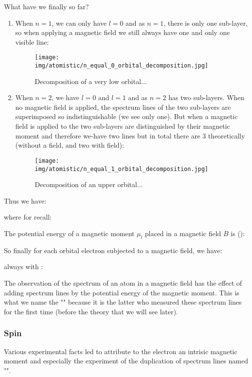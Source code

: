      What have we finally so far?
     \begin{enumerate}
         \item When $n=1$, we can only have $l=0$ and as $n=1$, there is only one sub-layer, so when applying a magnetic field we still always have one and only one visible line:
         \begin{figure}[H]
			\centering
			\texttt{[image: img/atomistic/n\_equal\_0\_orbital\_decomposition.jpg]}
			\caption{Decomposition of a very low orbital...}
		\end{figure}
			
		\item When $n=2$, we have $l=0$ and $l=1$ and as $n=2$ has two sub-layers. When no magnetic field is applied, the spectrum lines of the two sub-layers are superimposed so indistinguishable (we see only one). But when a magnetic field is applied to the two sub-layers are distinguished by their magnetic moment and therefore we-have two lines but in total there are 3 theoretically (without a field, and two with field):
		\begin{figure}[H]
			\centering
			\texttt{[image: img/atomistic/n\_equal\_1\_orbital\_decomposition.jpg]}
			\caption{Decomposition of an upper orbital...}
		\end{figure}
     \end{enumerate}
	Thus we have:
    
    where for recall:
     
    The potential energy of a magnetic moment $\mu_l$ placed in a magnetic field $B$ is ():
       
    So finally for each orbital electron subjected to a magnetic field, we have:
    
     always with :
     
     The observation of the spectrum of an atom in a magnetic field has the effect of adding spectrum lines by the potential energy of the magnetic moment. This is what we name the "" because it is the latter who measured these spectrum lines for the first time (before the theory that we will see later).
     
     \subsubsection{Spin}
     Various experimental facts led to attribute to the electron an intrisic magnetic moment and especially the experiment of the duplication of spectrum lines named "".

